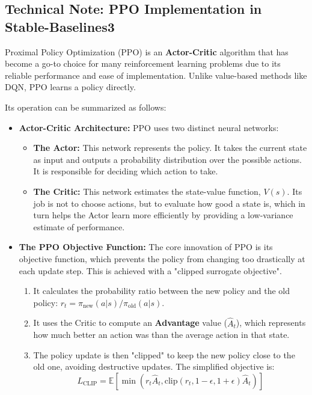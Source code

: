 
\subsection*{Technical Note: PPO Implementation in Stable-Baselines3}

Proximal Policy Optimization (PPO) is an \textbf{Actor-Critic} algorithm that has become a go-to choice for many reinforcement learning problems due to its reliable performance and ease of implementation. Unlike value-based methods like DQN, PPO learns a policy directly.

Its operation can be summarized as follows:

\begin{itemize}
    \item \textbf{Actor-Critic Architecture:} PPO uses two distinct neural networks:
    \begin{itemize}
        \item \textbf{The Actor:} This network represents the policy. It takes the current state as input and outputs a probability distribution over the possible actions. It is responsible for deciding which action to take.
        \item \textbf{The Critic:} This network estimates the state-value function, $V(s)$. Its job is not to choose actions, but to evaluate how good a state is, which in turn helps the Actor learn more efficiently by providing a low-variance estimate of performance.
    \end{itemize}

    \item \textbf{The PPO Objective Function:} The core innovation of PPO is its objective function, which prevents the policy from changing too drastically at each update step. This is achieved with a "clipped surrogate objective".
    \begin{enumerate}
        \item It calculates the probability ratio between the new policy and the old policy: $r_t = \pi_{\text{new}}(a|s) / \pi_{\text{old}}(a|s)$.
        \item It uses the Critic to compute an \textbf{Advantage} value ($\hat{A}_t$), which represents how much better an action was than the average action in that state.
        \item The policy update is then "clipped" to keep the new policy close to the old one, avoiding destructive updates. The simplified objective is:
        \[ L_{\text{CLIP}} = \mathbb{E} \left[ \min \left( r_t \hat{A}_t, \text{clip}(r_t, 1-\epsilon, 1+\epsilon) \hat{A}_t \right) \right] \]
    \end{enumerate}


\end{itemize}
